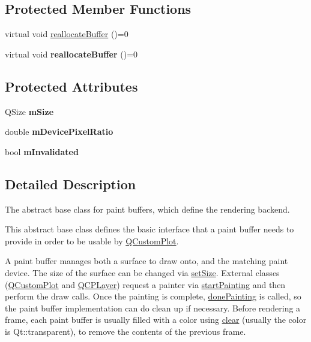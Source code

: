 \subsection*{Protected Member Functions}
\begin{DoxyCompactItemize}
\item 
virtual void \hyperlink{class_q_c_p_abstract_paint_buffer_aee7506a52bd7e5a07c2af27935eb13e7}{reallocate\+Buffer} ()=0
\item 
\mbox{\label{class_q_c_p_abstract_paint_buffer_a9bbd9f7520ccfa3e13fc737813f706e4}} 
virtual void {\bfseries reallocate\+Buffer} ()=0
\end{DoxyCompactItemize}
\subsection*{Protected Attributes}
\begin{DoxyCompactItemize}
\item 
\mbox{\label{class_q_c_p_abstract_paint_buffer_ae246c426222bfa18d5e8797fab73e3ce}} 
Q\+Size {\bfseries m\+Size}
\item 
\mbox{\label{class_q_c_p_abstract_paint_buffer_a33c1fd784478441fcff9ebf3d69af5b2}} 
double {\bfseries m\+Device\+Pixel\+Ratio}
\item 
\mbox{\label{class_q_c_p_abstract_paint_buffer_a3bc49cc9cf9daaca3a60977f010c08c9}} 
bool {\bfseries m\+Invalidated}
\end{DoxyCompactItemize}


\subsection{Detailed Description}
The abstract base class for paint buffers, which define the rendering backend. 

This abstract base class defines the basic interface that a paint buffer needs to provide in order to be usable by \hyperlink{class_q_custom_plot}{Q\+Custom\+Plot}.

A paint buffer manages both a surface to draw onto, and the matching paint device. The size of the surface can be changed via \hyperlink{class_q_c_p_abstract_paint_buffer_a8b68c3cd36533f1a4a23b5ce8cd66f01}{set\+Size}. External classes (\hyperlink{class_q_custom_plot}{Q\+Custom\+Plot} and \hyperlink{class_q_c_p_layer}{Q\+C\+P\+Layer}) request a painter via \hyperlink{class_q_c_p_abstract_paint_buffer_a9e9f29b19c033cf02fb96f1a148463f3}{start\+Painting} and then perform the draw calls. Once the painting is complete, \hyperlink{class_q_c_p_abstract_paint_buffer_a41b0dc6e7744f19fae09f8532c207dc1}{done\+Painting} is called, so the paint buffer implementation can do clean up if necessary. Before rendering a frame, each paint buffer is usually filled with a color using \hyperlink{class_q_c_p_abstract_paint_buffer_a9e253f4541dfc01992b77e8830bd7722}{clear} (usually the color is {\ttfamily Qt\+::transparent}), to remove the contents of the previous frame.

